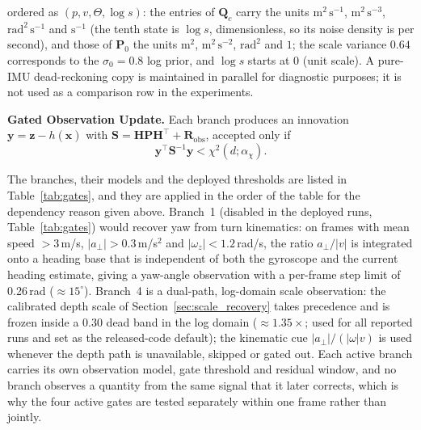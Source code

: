 ordered as $(p,v,\Theta,\log s)$: the entries of $\mathbf{Q}_c$ carry the units $\mathrm{m^2\,s^{-1}}$, $\mathrm{m^2\,s^{-3}}$, $\mathrm{rad^2\,s^{-1}}$ and $\mathrm{s^{-1}}$ (the tenth state is $\log s$, dimensionless, so its noise density is per second), and those of $\mathbf{P}_0$ the units $\mathrm{m^2}$, $\mathrm{m^2\,s^{-2}}$, $\mathrm{rad^2}$ and $1$; the scale variance $0.64$ corresponds to the $\sigma_0=0.8$ log prior, and $\log s$ starts at $0$ (unit scale). A pure-IMU dead-reckoning copy is maintained in parallel for diagnostic purposes; it is not used as a comparison row in the experiments.

\textbf{Gated Observation Update.} Each branch produces an innovation $\mathbf{y}=\mathbf{z}-h(\hat{\mathbf{x}})$ with $\mathbf{S}=\mathbf{H}\mathbf{P}\mathbf{H}^{\top}+\mathbf{R}_{\mathrm{obs}}$, accepted only if
\begin{equation}
    \mathbf{y}^{\top}\mathbf{S}^{-1}\mathbf{y}<\chi^2(d;\alpha_\chi).
    \label{eq:gate}
\end{equation}

The branches, their models and the deployed thresholds are listed in Table~\ref{tab:gates}, and they are applied in the order of the table for the dependency reason given above. Branch~1 (disabled in the deployed runs, Table~\ref{tab:gates}) would recover yaw from turn kinematics: on frames with mean speed $>3$\,m/s, $|a_\perp|>0.3$\,m/s$^2$ and $|\omega_z|<1.2$\,rad/s, the ratio $a_\perp/|v|$ is integrated onto a heading base that is independent of both the gyroscope and the current heading estimate, giving a yaw-angle observation with a per-frame step limit of 0.26\,rad ($\approx15^{\circ}$). Branch~4 is a dual-path, log-domain scale observation: the calibrated depth scale of Section~\ref{sec:scale_recovery} takes precedence and is frozen inside a 0.30 dead band in the log domain ($\approx1.35\times$; used for all reported runs and set as the released-code default); the kinematic cue $|a_\perp|/(|\omega|v)$ is used whenever the depth path is unavailable, skipped or gated out. Each active branch carries its own observation model, gate threshold and residual window, and no branch observes a quantity from the same signal that it later corrects, which is why the four active gates are tested separately within one frame rather than jointly.

